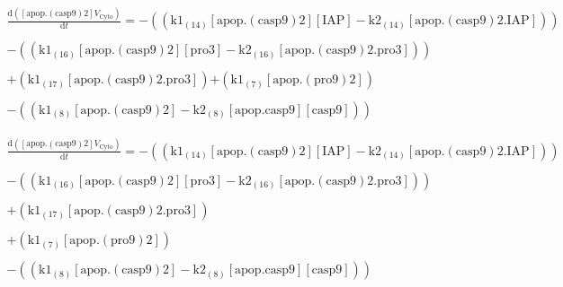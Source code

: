 \documentclass[a4paper,12pt]{article} %
\newcommand{\M}[1]{\mathrm{#1}}
\begin{document}
\begin{equation}
\begin{split}
\frac {\M{d}( {{\M{[apop.(casp9)2]}}    {V}_{\M{Cyto}} } ) }  {\M{d}{t} }  =  {  -  (( {{\M{k1}}_{\M{(14)}}    {\M{[apop.(casp9)2]}}    {\M{[IAP]}}  -  {\M{k2}}_{\M{(14)}}    {\M{[apop.(casp9)2.IAP]}} } )) } \\ 
  \\ 
   {  -  (( {{\M{k1}}_{\M{(16)}}    {\M{[apop.(casp9)2]}}    {\M{[pro3]}}  -  {\M{k2}}_{\M{(16)}}    {\M{[apop.(casp9)2.pro3]}} } )) } \\ 
  \\ 
   {  +  ( {{\M{k1}}_{\M{(17)}}    {\M{[apop.(casp9)2.pro3]}} } ) } 
   {  +  ( {{\M{k1}}_{\M{(7)}}    {\M{[apop.(pro9)2]}} } ) } \\ 
  \\ 
   {  -  (( {{\M{k1}}_{\M{(8)}}    {\M{[apop.(casp9)2]}}  -  {\M{k2}}_{\M{(8)}}    {\M{[apop.casp9]}}    {\M{[casp9]}} } )) } \end{split}
\end{equation}


\begin{equation}
\begin{split}
\frac {\M{d}( {{\M{[apop.(casp9)2]}}    {V}_{\M{Cyto}} } ) }  {\M{d}{t} }  =  {  -  (( {{\M{k1}}_{\M{(14)}}    {\M{[apop.(casp9)2]}}    {\M{[IAP]}}  -  {\M{k2}}_{\M{(14)}}    {\M{[apop.(casp9)2.IAP]}} } )) } \\ 
  \\ 
   {  -  (( {{\M{k1}}_{\M{(16)}}    {\M{[apop.(casp9)2]}}    {\M{[pro3]}}  -  {\M{k2}}_{\M{(16)}}    {\M{[apop.(casp9)2.pro3]}} } )) } \\ 
  \\ 
   {  +  ( {{\M{k1}}_{\M{(17)}}    {\M{[apop.(casp9)2.pro3]}} } ) } \\ 
  \\ 
   {  +  ( {{\M{k1}}_{\M{(7)}}    {\M{[apop.(pro9)2]}} } ) } \\ 
  \\ 
   {  -  (( {{\M{k1}}_{\M{(8)}}    {\M{[apop.(casp9)2]}}  -  {\M{k2}}_{\M{(8)}}    {\M{[apop.casp9]}}    {\M{[casp9]}} } )) } \end{split}
\end{equation}
\end{document}
